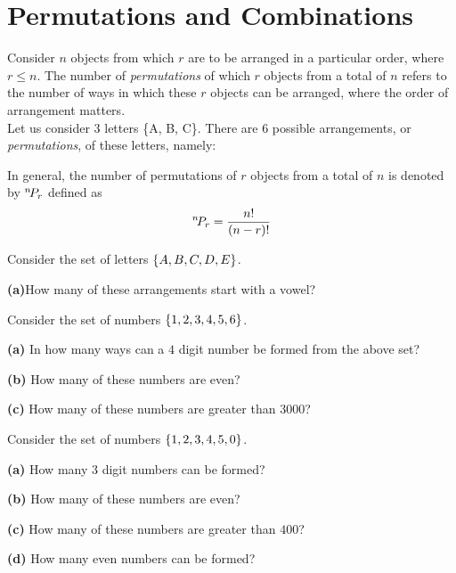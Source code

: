 \newcommand*{\perm}[1][-3mu]{\permcomb[#1]{P}}
\newcommand*{\permcomb}[4][0mu]{{{}^{#3}\mkern#1#2_{#4}}}



	\chapter{Permutations and Combinations}
	Consider $n$ objects from which $r$ are to be arranged in a particular order, where $r \leq n$. The number of \textit{permutations} of which $r$ objects from a total of $n$ refers to the number of ways in which these $r$ objects can be arranged, where the order of arrangement matters.\\
	
	
	Let us consider $3$ letters \{A, B, C\}. There are $6$ possible arrangements, or \textit{permutations}, of these letters, namely:
	\begin{center}
	\end{center}
	In general, the number of permutations of $r$ objects from a total of $n$ is denoted by $\perm n r$ defined as \[\perm n r = \dfrac{n!}{(n-r)!}\]
	
	\begin{example}
		Consider the set of letters $\set{A,B,C,D,E}$. 
		
		\quad\textbf{(a)}How many of these arrangements start with a vowel?
	\end{example}
	
	\begin{example}
		Consider the set of numbers $\set{1,2,3,4,5,6}$.
		
		\quad\textbf{(a)} In how many ways can a $4$ digit number be formed from the above set? 
		
		\quad\textbf{(b)} How many of these numbers are even? 
		
		\quad\textbf{(c)} How many of these numbers are greater than 3000?
	\end{example}
	
	\begin{example}
		Consider the set of numbers $\set{1,2,3,4,5,0}$.
		
		\quad\textbf{(a)} How many $3$ digit numbers can be formed?
		
		\quad\textbf{(b)} How many of these numbers are even?
		
		\quad\textbf{(c)} How many of these numbers are greater than $400$?
		
		\quad\textbf{(d)} How many even numbers can be formed?
	\end{example} 
	
